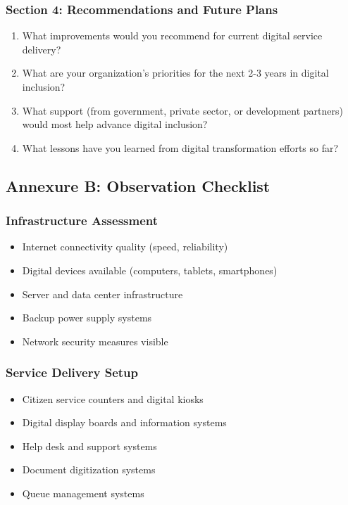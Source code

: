 \documentclass[12pt,a4paper]{article}
\begin{document}
\subsubsection{Section 4: Recommendations and Future Plans}

\begin{enumerate}[resume]
    \item What improvements would you recommend for current digital service delivery?
    \item What are your organization's priorities for the next 2-3 years in digital inclusion?
    \item What support (from government, private sector, or development partners) would most help advance digital inclusion?
    \item What lessons have you learned from digital transformation efforts so far?
\end{enumerate}

\subsection{Annexure B: Observation Checklist}

\subsubsection{Infrastructure Assessment}

\begin{itemize}
    \item[$\square$] Internet connectivity quality (speed, reliability)
    \item[$\square$] Digital devices available (computers, tablets, smartphones)
    \item[$\square$] Server and data center infrastructure
    \item[$\square$] Backup power supply systems
    \item[$\square$] Network security measures visible
\end{itemize}

\subsubsection{Service Delivery Setup}

\begin{itemize}
    \item[$\square$] Citizen service counters and digital kiosks
    \item[$\square$] Digital display boards and information systems
    \item[$\square$] Help desk and support systems
    \item[$\square$] Document digitization systems
    \item[$\square$] Queue management systems
\end{itemize}
\end{document}
